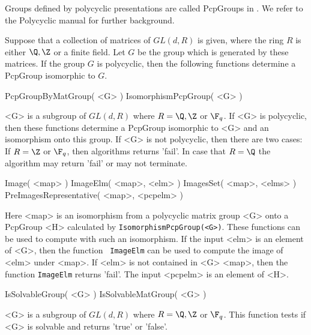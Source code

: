 
\label{section_present}
 
Groups defined by polycyclic presentations are called PcpGroups in
{\GAP}.
We refer to the Polycyclic manual \cite{polycyclic} for further
background.

Suppose that a collection of
matrices of $GL(d,R)$ is given, where the ring $R$ 
is either $\Q,\Z$ or a finite field.  Let $G$ be the group which is
generated by these matrices. If the group $G$ is polycyclic, then the
following functions determine a PcpGroup isomorphic to $G$.
 
\> PcpGroupByMatGroup( <G> )
\> IsomorphismPcpGroup( <G> )
 
<G> is  a subgroup of $GL(d,R)$ where $R=\Q,\Z $ or $\F_q$.
If <G> is polycyclic, then 
these functions determine a PcpGroup isomorphic to <G> and an isomorphism
onto this group. 
If <G> is not polycyclic, then there are two cases: If $R=\Z$ or $\F_q$,
then algorithms returns 'fail'. In case that $R=\Q$ the algorithm may
return 'fail' or may not terminate.

\> Image( <map> ) 
\> ImageElm( <map>, <elm> )
\> ImagesSet( <map>, <elms> )
\> PreImagesRepresentative( <map>, <pcpelm> )
 
Here <map> is an isomorphism from a polycyclic matrix group <G>
onto a PcpGroup <H> calculated
by {\tt IsomorphismPcpGroup(<G>)}.
These functions can be used to compute with such an isomorphism. 
If the input <elm>  is an element of <G>, then the function {\tt
ImageElm} can be used to compute the image of <elm> under <map>. 
If <elm> is not contained in <G>
<map>,
then the function {\tt ImageElm} returns 'fail'. 
The input <pcpelm> is an element
of <H>. 

\> IsSolvableGroup( <G> )
\> IsSolvableMatGroup( <G> )

<G> is  a subgroup of $GL(d,R)$ where $R=\Q,\Z $ or $\F_q$.
This function tests if <G> is
solvable and returns 'true' or 'false'. 

